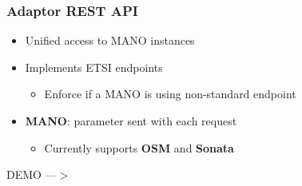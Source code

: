 \begin{frame}
\frametitle{Adaptor REST API}

\begin{itemize}[<+->]
	\item Unified access to MANO instances			

	\item Implements ETSI endpoints
	\begin{itemize}
		\item Enforce if a MANO is using non-standard endpoint
	\end{itemize}
	
	\item \textbf{MANO}: parameter sent with each request
	\begin{itemize}
		\item Currently supports \textbf{OSM} and \textbf{Sonata}
	\end{itemize}
		
\end{itemize}
\end{frame}

\begin{frame}

\Huge{\centerline{DEMO ---$ > $}}

\end{frame}
